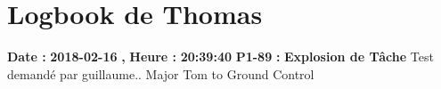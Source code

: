 \documentclass{article}%
\begin{document}
%
\section{Logbook de Thomas}%
\textbf{Date : }%
\textbf{2018{-}02{-}16}%
\textbf{,}%
\textbf{ Heure : }%
\textbf{20:39:40}%
\newline%
%
\textbf{P1{-}89 }%
\textbf{ : }%
\textbf{ Explosion de Tâche}%
\newline%
\newline%
%
Test demandé par guillaume.. Major Tom to Ground Control\newline%
\newline%
%
\newpage

%
\end{document}

